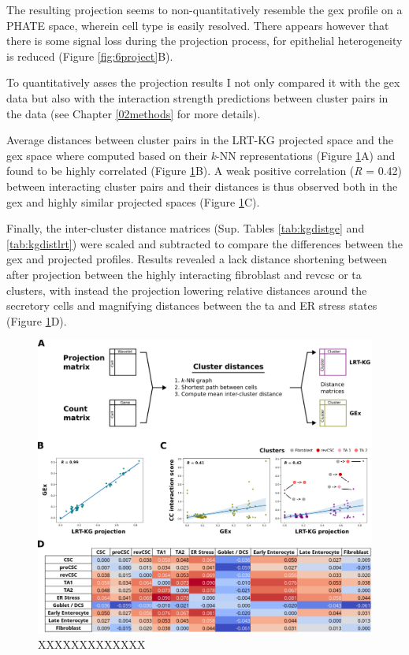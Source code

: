 The resulting projection seems to non-quantitatively resemble the \acrshort{gex} profile on a PHATE space, wherein cell type is easily resolved. There appears however that there is some signal loss during the projection process, for epithelial heterogeneity is reduced (Figure \ref{fig:6project}B). 

To quantitatively asses the projection results I not only compared it with the \acrshort{gex} data but also with the interaction strength predictions between cluster pairs in the data (see Chapter \ref{02methods} for more details). 

Average distances between cluster pairs in the LRT-KG projected space and the \acrshort{gex} space where computed based on their \emph{k}-NN representations (Figure \ref{fig:6bench}A) and found to be highly correlated (Figure \ref{fig:6bench}B). A weak positive correlation (\emph{R} = 0.42) between interacting cluster pairs and their distances is thus observed both in the \acrshort{gex} and highly similar projected spaces (Figure \ref{fig:6bench}C).

Finally, the inter-cluster distance matrices (Sup. Tables \ref{tab:kgdistge} and \ref{tab:kgdistlrt}) were scaled and subtracted to compare the differences between the \acrshort{gex} and projected profiles. Results revealed a lack distance shortening between after projection between the highly interacting fibroblast and \acrshort{revcsc} or \acrshort{ta} clusters, with instead the projection lowering relative distances around the secretory cells and magnifying distances between the \acrshort{ta} and ER stress states (Figure \ref{fig:6bench}D).

\begin{figure}
    \centering
    \includegraphics{06kg/figs/6KG_bench.png}
    \caption{XXXXXXXXXXXXX}
    \label{fig:6bench}
\end{figure}

